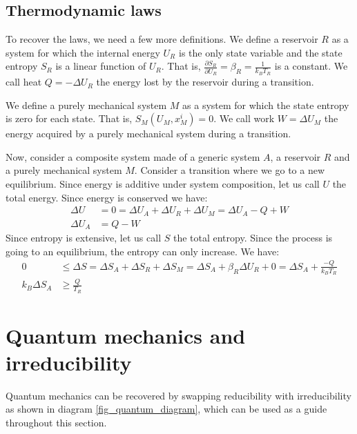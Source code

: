 \documentclass[11pt,letterpaper,fleqn]{memoir} %
\begin{document}
\subsection{Thermodynamic laws}

To recover the laws, we need a few more definitions. We define a reservoir $R$ as a system for which the internal energy $U_R$ is the only state variable and the state entropy $S_R$ is a linear function of $U_R$. That is, $\frac{\partial S_R}{\partial U_R} = \beta_R = \frac{1}{k_B T_R}$ is a constant. We call heat $Q=-\Delta U_R$ the energy lost by the reservoir during a transition.

We define a purely mechanical system $M$ as a system for which the state entropy is zero for each state. That is, $S_M(U_M, x^i_M) = 0$. We call work $W = \Delta U_M$ the energy acquired by a purely mechanical system during a transition.

Now, consider a composite system made of a generic system $A$, a reservoir $R$ and a purely mechanical system $M$. Consider a transition where we go to a new equilibrium. Since energy is additive under system composition, let us call $U$ the total energy. Since energy is conserved we have:
\begin{equation}
	\begin{aligned}
		\Delta U &= 0 = \Delta U_A + \Delta U_R +\Delta U_M = \Delta U_A - Q + W \\
		\Delta U_A &= Q - W
	\end{aligned}
\end{equation}
Since entropy is extensive, let us call $S$ the total entropy. Since the process is going to an equilibrium, the entropy can only increase. We have:
\begin{equation}
	\begin{aligned}
		0 &\leq \Delta S = \Delta S_A + \Delta S_R +\Delta S_M = \Delta S_A + \beta_R \Delta U_R + 0 = \Delta S_A + \frac{-Q}{k_B T_R} \\
		k_B \Delta S_A &\geq \frac{Q}{T_R}
	\end{aligned}
\end{equation}

\section{Quantum mechanics and irreducibility}

Quantum mechanics can be recovered by swapping reducibility with irreducibility as shown in diagram \ref{fig_quantum_diagram}, which can be used as a guide throughout this section.
\end{document}
